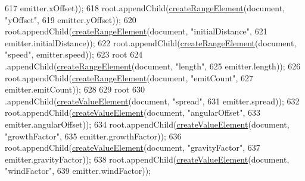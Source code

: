 \begin{DoxyCode}
617                 emitter.xOffset));
618         root.appendChild(\mbox{\hyperlink{classorg_1_1newdawn_1_1slick_1_1particles_1_1_particle_i_o_a9c35ea6edbfd626b65a23b87517c323d}{createRangeElement}}(document, \textcolor{stringliteral}{"yOffset"},
619                 emitter.yOffset));
620         root.appendChild(\mbox{\hyperlink{classorg_1_1newdawn_1_1slick_1_1particles_1_1_particle_i_o_a9c35ea6edbfd626b65a23b87517c323d}{createRangeElement}}(document, \textcolor{stringliteral}{"initialDistance"},
621                 emitter.initialDistance));
622         root.appendChild(\mbox{\hyperlink{classorg_1_1newdawn_1_1slick_1_1particles_1_1_particle_i_o_a9c35ea6edbfd626b65a23b87517c323d}{createRangeElement}}(document, \textcolor{stringliteral}{"speed"}, emitter.speed));
623         root
624                 .appendChild(\mbox{\hyperlink{classorg_1_1newdawn_1_1slick_1_1particles_1_1_particle_i_o_a9c35ea6edbfd626b65a23b87517c323d}{createRangeElement}}(document, \textcolor{stringliteral}{"length"},
625                         emitter.length));
626         root.appendChild(\mbox{\hyperlink{classorg_1_1newdawn_1_1slick_1_1particles_1_1_particle_i_o_a9c35ea6edbfd626b65a23b87517c323d}{createRangeElement}}(document, \textcolor{stringliteral}{"emitCount"},
627                 emitter.emitCount));
628 
629         root
630                 .appendChild(\mbox{\hyperlink{classorg_1_1newdawn_1_1slick_1_1particles_1_1_particle_i_o_ad9f392331cc84467398b6ac9c41a1d7b}{createValueElement}}(document, \textcolor{stringliteral}{"spread"},
631                         emitter.spread));
632         root.appendChild(\mbox{\hyperlink{classorg_1_1newdawn_1_1slick_1_1particles_1_1_particle_i_o_ad9f392331cc84467398b6ac9c41a1d7b}{createValueElement}}(document, \textcolor{stringliteral}{"angularOffset"},
633                 emitter.angularOffset));
634         root.appendChild(\mbox{\hyperlink{classorg_1_1newdawn_1_1slick_1_1particles_1_1_particle_i_o_ad9f392331cc84467398b6ac9c41a1d7b}{createValueElement}}(document, \textcolor{stringliteral}{"growthFactor"},
635                 emitter.growthFactor));
636         root.appendChild(\mbox{\hyperlink{classorg_1_1newdawn_1_1slick_1_1particles_1_1_particle_i_o_ad9f392331cc84467398b6ac9c41a1d7b}{createValueElement}}(document, \textcolor{stringliteral}{"gravityFactor"},
637                 emitter.gravityFactor));
638         root.appendChild(\mbox{\hyperlink{classorg_1_1newdawn_1_1slick_1_1particles_1_1_particle_i_o_ad9f392331cc84467398b6ac9c41a1d7b}{createValueElement}}(document, \textcolor{stringliteral}{"windFactor"},
639                 emitter.windFactor));

\end{DoxyCode}
